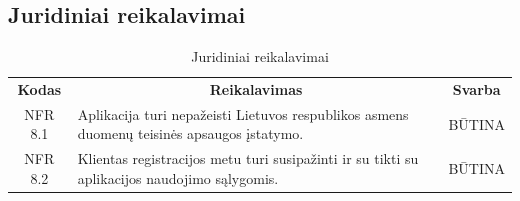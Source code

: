\documentclass{VUMIFPSkursinis}
\begin{document}
\subsection{Juridiniai reikalavimai}
\begin{center}
	\begin{table}[H]
	\caption{Juridiniai reikalavimai}
	\begin{tabular}{|p{2cm}|p{}|p{}|}
	\hline
	    \rowcolor{lightgray}
		\multicolumn{3}{|c|}{Juridiniai reikalavimai}\\
		
	\hline
		\multicolumn{1}{|c|}{{\bfseries Kodas}}&
		\multicolumn{1}{|c|}{{\bfseries Reikalavimas}}&
		\multicolumn{1}{|c|}{{\bfseries Svarba}}\\
	\hline 	
		\multicolumn{1}{|c|}{NFR 8.1}&
		{Aplikacija turi nepažeisti Lietuvos respublikos asmens duomenų teisinės apsaugos įstatymo.}&
		\multicolumn{1}{|c|}{BŪTINA}\\	
	
	\hline 	
		\multicolumn{1}{|c|}{NFR 8.2}&
		{Klientas registracijos metu turi susipažinti ir su tikti su aplikacijos naudojimo sąlygomis.}&
		\multicolumn{1}{|c|}{BŪTINA}\\	
	
	\hline 	
	\end{tabular}
	
	\label{table:Juridiniaireikalavimai}
	\end{table}

\end{center}

\pagebreak

\end{document}
